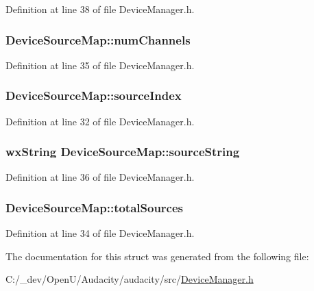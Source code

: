 Definition at line 38 of file Device\+Manager.\+h.

\subsubsection[{\texorpdfstring{num\+Channels}{numChannels}}]{ Device\+Source\+Map\+::num\+Channels}\hypertarget{struct_device_source_map_a3d791c17175702ded8114bc12ae5b283}{}\label{struct_device_source_map_a3d791c17175702ded8114bc12ae5b283}


Definition at line 35 of file Device\+Manager.\+h.

\subsubsection[{\texorpdfstring{source\+Index}{sourceIndex}}]{ Device\+Source\+Map\+::source\+Index}\hypertarget{struct_device_source_map_a8929f90f4dcbb822f6410172538ef703}{}\label{struct_device_source_map_a8929f90f4dcbb822f6410172538ef703}


Definition at line 32 of file Device\+Manager.\+h.

\subsubsection[{\texorpdfstring{source\+String}{sourceString}}]{\setlength{\rightskip}{0pt plus 5cm}wx\+String Device\+Source\+Map\+::source\+String}\hypertarget{struct_device_source_map_a973daa8e8a29fc02e41ab15e931f5544}{}\label{struct_device_source_map_a973daa8e8a29fc02e41ab15e931f5544}


Definition at line 36 of file Device\+Manager.\+h.

\subsubsection[{\texorpdfstring{total\+Sources}{totalSources}}]{ Device\+Source\+Map\+::total\+Sources}\hypertarget{struct_device_source_map_abe8670c3c3d98c3bf71fcdba159fd9ae}{}\label{struct_device_source_map_abe8670c3c3d98c3bf71fcdba159fd9ae}


Definition at line 34 of file Device\+Manager.\+h.



The documentation for this struct was generated from the following file\+:\begin{DoxyCompactItemize}
\item 
C\+:/\+\_\+dev/\+Open\+U/\+Audacity/audacity/src/\hyperlink{_device_manager_8h}{Device\+Manager.\+h}\end{DoxyCompactItemize}

